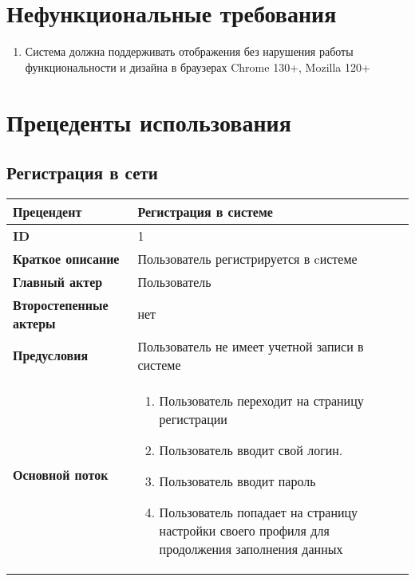 \documentclass{article}
\begin{document}
\section{Нефункциональные требования}
\begin{enumerate}[label=\textbf{NFR\arabic*}.]
	\item Система должна поддерживать отображения без нарушения работы функциональности
	      и дизайна в браузерах Chrome 130+, Mozilla 120+
\end{enumerate}

\section{Прецеденты использования}
\subsection{Регистрация в сети}
\begin{tabular}{|l|p{9cm}|}
	\hline
	\textbf{Прецендент}            & Регистрация в системе                                                                             \\
	\hline
	\textbf{ID}                    & 1                                                                                                 \\
	\hline
	\textbf{Краткое описание}      & Пользователь регистрируется в cистеме                                                             \\
	\hline
	\textbf{Главный актер}         & Пользователь                                                                                      \\
	\hline
	\textbf{Второстепенные актеры} & нет                                                                                               \\
	\hline
	\textbf{Предусловия}           & Пользователь не имеет учетной записи в системе                                                    \\
	\hline
	\textbf{Основной поток}        & \begin{enumerate}
		                                 \item Пользователь переходит на страницу регистрации
		                                 \item Пользователь вводит свой логин.
		                                 \item Пользователь вводит пароль
		                                 \item Пользователь попадает на страницу настройки своего профиля для продолжения заполнения данных
	                                 \end{enumerate} \\
	\hline
\end{tabular}
\end{document}
